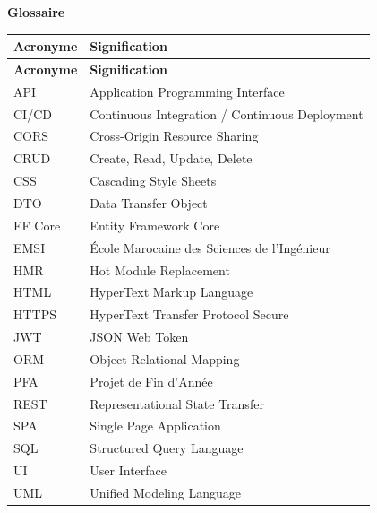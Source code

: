 \clearpage
\thispagestyle{chaptertitlepage}

\vspace*{2cm}

\begin{center}
{\fontsize{24}{29}\selectfont\bfseries Glossaire}
\end{center}

\vspace{1.5cm}

\begin{longtable}{@{} l p{12cm} @{}}
\toprule
\textbf{Acronyme} & \textbf{Signification} \\
\midrule
\endfirsthead
\toprule
\textbf{Acronyme} & \textbf{Signification} \\
\midrule
\endhead
\bottomrule
\endfoot
API     & Application Programming Interface \\
CI/CD   & Continuous Integration / Continuous Deployment \\
CORS    & Cross-Origin Resource Sharing \\
CRUD    & Create, Read, Update, Delete \\
CSS     & Cascading Style Sheets \\
DTO     & Data Transfer Object \\
EF Core & Entity Framework Core \\
EMSI    & École Marocaine des Sciences de l'Ingénieur \\
HMR     & Hot Module Replacement \\
HTML    & HyperText Markup Language \\
HTTPS   & HyperText Transfer Protocol Secure \\
JWT     & JSON Web Token \\
ORM     & Object-Relational Mapping \\
PFA     & Projet de Fin d'Année \\
REST    & Representational State Transfer \\
SPA     & Single Page Application \\
SQL     & Structured Query Language \\
UI      & User Interface \\
UML     & Unified Modeling Language \\
\end{longtable}

\clearpage
